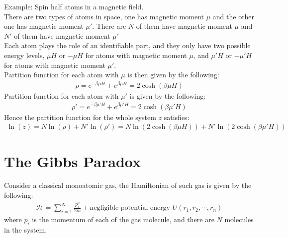 \documentclass[11pt,oneside]{book}
\theoremstyle{break}
\theoremstyle{break}
\newcommand{\example}{\color{green}Example: \color{black}}
\begin{document}
\newpage

\example Spin half atoms in a magnetic field.\\
There are two types of atoms in space, one has magnetic moment $\mu$ and the other one has magnetic moment $\mu'$. There are $N$ of them have magnetic moment $\mu$ and $N'$ of them have magnetic moment $\mu'$\\

Each atom plays the role of an identifiable part, and they only have two possible energy levels, $\mu H$ or $-\mu H$ for atoms with magnetic moment $\mu$, and $\mu' H$ or $-\mu' H$ for atoms with magnetic moment $\mu'$.\\

Partition function for each atom with $\mu$ is then given by the following:
\begin{align*}
\rho = e^{-\beta \mu H} + e^{\beta \mu H} = 2\cosh (\beta \mu H)
\end{align*}
Partition function for each atom with $\mu'$ is given by the following:
\begin{align*}
\rho' = e^{-\beta \mu' H} + e^{\beta \mu' H} = 2\cosh (\beta \mu' H)
\end{align*}
Hence the partition function for the whole system $z$ satisfies:
\begin{align*}
\ln(z) = N \ln(\rho) + N' \ln (\rho') = N \ln(2\cosh(\beta \mu H)) + N' \ln( 2\cosh(\beta \mu' H))
\end{align*}


\newpage
\section[The Gibbs Paradox]{\color{red}The Gibbs Paradox\color{black}}
Consider a classical monoatomic gas, the Hamiltonian of such gas is given by the following:
\begin{align*}
\mathcal{H} = \sum_{i=1}^N \frac{p_i^2}{2m}+\text{negligible potential energy }U(r_1,r_2,\cdots, r_n) 
\end{align*}
where $p_i$ is the momentum of each of the gas molecule, and there are $N$ molecules in the system.\\
\end{document}
